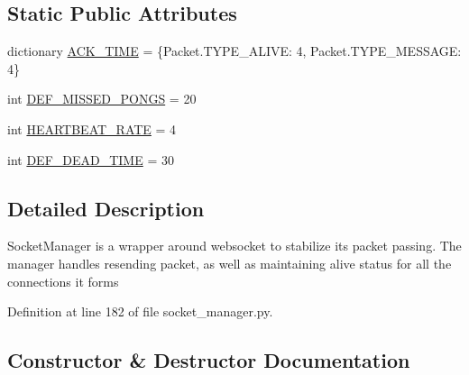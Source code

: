 \subsection*{Static Public Attributes}
\begin{DoxyCompactItemize}
\item 
dictionary \hyperlink{classparlai_1_1mturk_1_1core_1_1socket__manager_1_1SocketManager_a797b45ad87ca205c4e15ec3f76fdef46}{A\+C\+K\+\_\+\+T\+I\+ME} = \{Packet.\+T\+Y\+P\+E\+\_\+\+A\+L\+I\+V\+E\+: 4, Packet.\+T\+Y\+P\+E\+\_\+\+M\+E\+S\+S\+A\+G\+E\+: 4\}
\item 
int \hyperlink{classparlai_1_1mturk_1_1core_1_1socket__manager_1_1SocketManager_aad7999f752467c1102a6a527888cab3f}{D\+E\+F\+\_\+\+M\+I\+S\+S\+E\+D\+\_\+\+P\+O\+N\+GS} = 20
\item 
int \hyperlink{classparlai_1_1mturk_1_1core_1_1socket__manager_1_1SocketManager_aa1fe9e255d2abe5eebb5584ba74d4fdb}{H\+E\+A\+R\+T\+B\+E\+A\+T\+\_\+\+R\+A\+TE} = 4
\item 
int \hyperlink{classparlai_1_1mturk_1_1core_1_1socket__manager_1_1SocketManager_a605181eb90b57d3cc5a0bc75e788c4fc}{D\+E\+F\+\_\+\+D\+E\+A\+D\+\_\+\+T\+I\+ME} = 30
\end{DoxyCompactItemize}


\subsection{Detailed Description}
\begin{DoxyVerb}SocketManager is a wrapper around websocket to stabilize its packet
passing. The manager handles resending packet, as well as maintaining
alive status for all the connections it forms
\end{DoxyVerb}
 

Definition at line 182 of file socket\+\_\+manager.\+py.



\subsection{Constructor \& Destructor Documentation}
\mbox{\label{classparlai_1_1mturk_1_1core_1_1socket__manager_1_1SocketManager_ad366f39cbef4d0d8307cf350cd088ff9}} 
